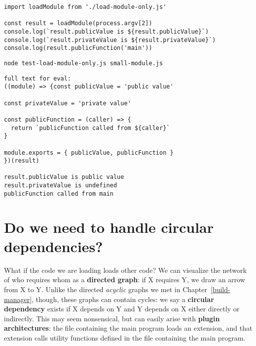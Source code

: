 \documentclass[krantzl]{krantz}
\newcommand{\chapref}[1]{Chapter~\ref{#1}}
\newcommand{\glossref}[1]{\textbf{#1}}
\begin{document}
\begin{lstlisting}[frame=tblr]
import loadModule from './load-module-only.js'

const result = loadModule(process.argv[2])
console.log(`result.publicValue is ${result.publicValue}`)
console.log(`result.privateValue is ${result.privateValue}`)
console.log(result.publicFunction('main'))
\end{lstlisting}



\begin{lstlisting}[frame=shadowbox]
node test-load-module-only.js small-module.js
\end{lstlisting}



\begin{lstlisting}[frame=tblr,backgroundcolor=\color{black!5}]
full text for eval:
((module) => {const publicValue = 'public value'

const privateValue = 'private value'

const publicFunction = (caller) => {
  return `publicFunction called from ${caller}`
}

module.exports = { publicValue, publicFunction }
})(result)

result.publicValue is public value
result.privateValue is undefined
publicFunction called from main
\end{lstlisting}


\section{Do we need to handle circular dependencies?}\label{module-loader-circular}


What if the code we are loading loads other code?
We can visualize the network of who requires whom as a \glossref{directed graph}:
if X requires Y,
we draw an arrow from X to Y.
Unlike the directed \emph{acyclic} graphs we met in \chapref{build-manager},
though,
these graphs can contain cycles:
we say a \glossref{circular dependency} exists
if X depends on Y and Y depends on X
either directly or indirectly.
This may seem nonsensical,
but can easily arise with \glossref{plugin architectures}:
the file containing the main program loads an extension,
and that extension calls utility functions defined in the file containing the main program.
\end{document}
